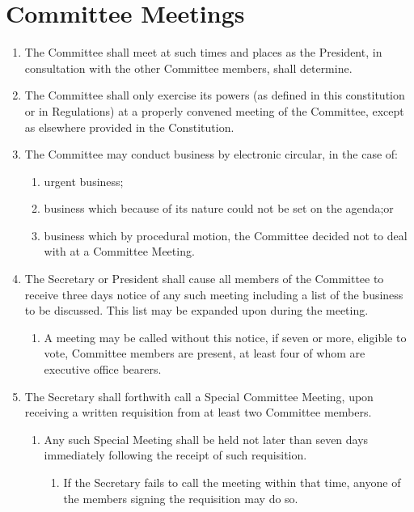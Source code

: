 \documentclass[a4paper]{article}
\begin{document}
\section{Committee Meetings} \label{sec:committee_meetings}
\begin{enumerate}
    \item The Committee shall meet at such times and places as the President, in consultation with the other Committee members, shall determine.
    \item The Committee shall only exercise its powers (as defined in this constitution or in Regulations) at a properly convened meeting of the Committee, except as elsewhere provided in the Constitution.
    \item The Committee may conduct business by electronic circular, in the case of:
          \begin{enumerate}
              \item urgent business;
              \item business which because of its nature could not be set on the agenda;or
              \item business which by procedural motion, the Committee decided not to deal with at a Committee Meeting.
          \end{enumerate}
    \item The Secretary or President shall cause all members of the Committee to receive three days notice of any such meeting including a list of the business to be discussed. This list may be expanded upon during the meeting.
          \begin{enumerate}
              \item A meeting may be called without this notice, if seven or more, eligible to vote, Committee members are present, at least four of whom are executive office bearers.
          \end{enumerate}
    \item The Secretary shall forthwith call a Special Committee Meeting, upon receiving a written requisition from at least two Committee members.
          \begin{enumerate}
              \item Any such Special Meeting shall be held not later than seven days immediately following the receipt of such requisition.
                    \begin{enumerate}
                        \item If the Secretary fails to call the meeting within that time, anyone of the members signing the requisition may do so.

\end{enumerate}
\end{enumerate}
\end{enumerate}
\end{document}
